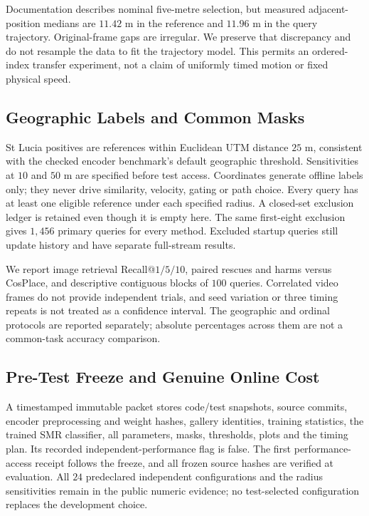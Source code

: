 \documentclass[conference]{IEEEtran}
\begin{document}
Documentation describes nominal five-metre selection, but measured adjacent-position medians are $11.42$ m in the reference and $11.96$ m in the query trajectory. Original-frame gaps are irregular. We preserve that discrepancy and do not resample the data to fit the trajectory model. This permits an ordered-index transfer experiment, not a claim of uniformly timed motion or fixed physical speed.

\subsection{Geographic Labels and Common Masks}
St Lucia positives are references within Euclidean UTM distance $25$ m, consistent with the checked encoder benchmark's default geographic threshold. Sensitivities at $10$ and $50$ m are specified before test access. Coordinates generate offline labels only; they never drive similarity, velocity, gating or path choice. Every query has at least one eligible reference under each specified radius. A closed-set exclusion ledger is retained even though it is empty here. The same first-eight exclusion gives $1,456$ primary queries for every method. Excluded startup queries still update history and have separate full-stream results.

We report image retrieval Recall@$1/5/10$, paired rescues and harms versus CosPlace, and descriptive contiguous blocks of $100$ queries. Correlated video frames do not provide independent trials, and seed variation or three timing repeats is not treated as a confidence interval. The geographic and ordinal protocols are reported separately; absolute percentages across them are not a common-task accuracy comparison.

\subsection{Pre-Test Freeze and Genuine Online Cost}
A timestamped immutable packet stores code/test snapshots, source commits, encoder preprocessing and weight hashes, gallery identities, training statistics, the trained SMR classifier, all parameters, masks, thresholds, plots and the timing plan. Its recorded independent-performance flag is false. The first performance-access receipt follows the freeze, and all frozen source hashes are verified at evaluation. All $24$ predeclared independent configurations and the radius sensitivities remain in the public numeric evidence; no test-selected configuration replaces the development choice.
\end{document}
